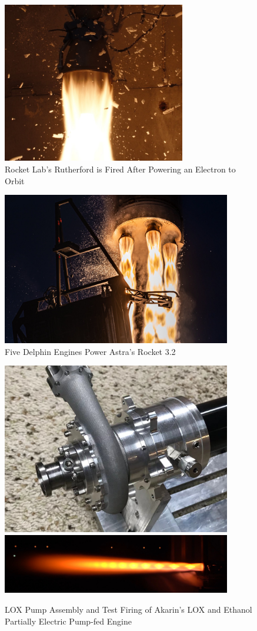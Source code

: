 \documentclass[12pt, letterpaper]{article}
\begin{document}
\begin{figure}[]
    \centering
    \includegraphics[width=8cm]{Images/Rutherford-Ignition3.jpg}
    \caption{Rocket Lab's Rutherford is Fired After Powering an Electron to Orbit}
\end{figure}

\begin{figure}[]
    \centering
    \includegraphics[width=10cm]{Images/AstraLaunch.jpg}
    \caption{Five Delphin Engines Power Astra's Rocket 3.2}
\end{figure}

\begin{figure}[t]
    \centering
    \includegraphics[width=10cm]{Images/Pump_LOX_reddit.jpeg}
    \includegraphics[width=10cm]{Images/ElectricPumpFedReddit.jpg}
    \caption{LOX Pump Assembly and Test Firing of Akarin's LOX and Ethanol Partially Electric Pump-fed Engine}
\end{figure}
\end{document}
